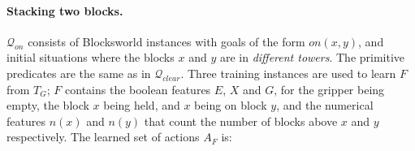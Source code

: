\documentclass[letterpaper]{article} %
\newcommand{\Q}{\mathcal{Q}}
\begin{document}
\paragraph{Stacking two blocks.}
$\Q_{on}$ consists  of Blocksworld instances with goals of the form $on(x,y)$,
and initial situations  where the blocks $x$ and $y$ are in \emph{different towers}.
The primitive predicates are the same as in $\Q_{clear}$.
Three training instances are used to learn $F$ from $T_G$;
$F$ contains
% 
the boolean features $E$, $X$ and $G$, for the gripper being empty, the
block $x$ being held, and $x$ being on block $y$, and the
numerical features $n(x)$ and $n(y)$ that count the number of blocks
above $x$ and $y$ respectively.
%
The learned set of actions $A_F$ is:
\end{document}
